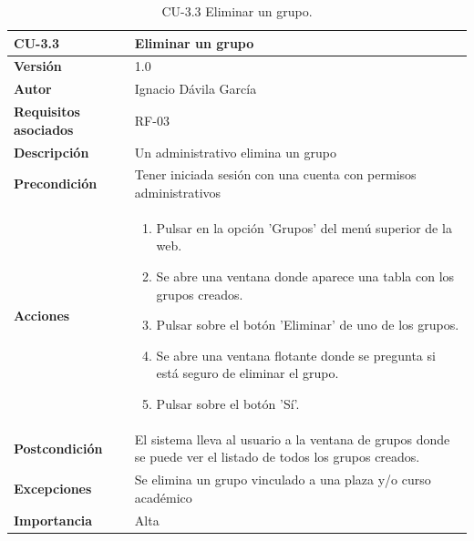 \begin{table}[p]
	\centering
	\begin{tabularx}{\linewidth}{ p{} p{} }
		\toprule
		\textbf{CU-3.3}    & \textbf{Eliminar un grupo}\\
		\toprule
		\textbf{Versión}              & 1.0    \\
		\textbf{Autor}                & Ignacio Dávila García \\
		\textbf{Requisitos asociados} & RF-03 \\
		\textbf{Descripción}          & Un administrativo elimina un grupo \\
		\textbf{Precondición}         & Tener iniciada sesión con una cuenta con permisos administrativos \\
		\textbf{Acciones}             &
		\begin{enumerate}
			\def\labelenumi{\arabic{enumi}.}
			\tightlist
			\item Pulsar en la opción 'Grupos' del menú superior de la web.
			\item Se abre una ventana donde aparece una tabla con los grupos creados.
			\item Pulsar sobre el botón 'Eliminar' de uno de los grupos.
			\item Se abre una ventana flotante donde se pregunta si está seguro de eliminar el grupo.
			\item Pulsar sobre el botón 'Sí'.
		\end{enumerate}\\
		\textbf{Postcondición}        & El sistema lleva al usuario a la ventana de grupos donde se puede ver el listado de todos los grupos creados. \\
		\textbf{Excepciones}          & Se elimina un grupo vinculado a una plaza y/o curso académico \\
		\textbf{Importancia}          & Alta \\
		\bottomrule
	\end{tabularx}
	\caption{CU-3.3 Eliminar un grupo.}
\end{table}

